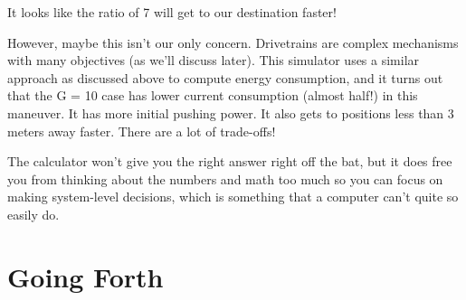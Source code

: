 \documentclass[10pt,letterpaper]{book}
\begin{document}
	It looks like the ratio of 7 will get to our destination faster!
	
	However, maybe this isn't our only concern. Drivetrains are complex mechanisms with many objectives (as we'll discuss later). This simulator uses a similar approach as discussed above to compute energy consumption, and it turns out that the G = 10 case has lower current consumption (almost half!) in this maneuver. It has more initial pushing power. It also gets to positions less than 3 meters away faster. There are a lot of trade-offs!
	
	The calculator won't give you the right answer right off the bat, but it does free you from thinking about the numbers and math too much so you can focus on making system-level decisions, which is something that a computer can't quite so easily do.
	
\chapter{Going Forth}
\end{document}
